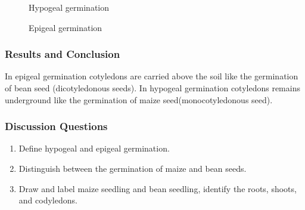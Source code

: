 \begin{figure}[h]
\begin{center}
\def\svgwidth{6cm}

\caption{Hypogeal germination}
\label{fig:hypogeal}
\end{center}
\end{figure}

\begin{figure}[h]
\begin{center}
\def\svgwidth{7cm}

\caption{Epigeal germination}
\label{fig:epigeal}
\end{center}
\end{figure}

\subsubsection*{Results and Conclusion}
In epigeal germination cotyledons are carried above the soil like the germination of bean seed (dicotyledonous seeds). In hypogeal germination cotyledons remains underground like the germination of maize seed(monocotyledonous seed).

\subsubsection*{Discussion Questions}
\begin{enumerate}
\item{Define hypogeal and epigeal germination.}
\item{Distinguish between the germination of maize and bean seeds.}
\item{Draw and label maize seedling and bean seedling, identify the roots, shoots, and codyledons.}
\end{enumerate}
